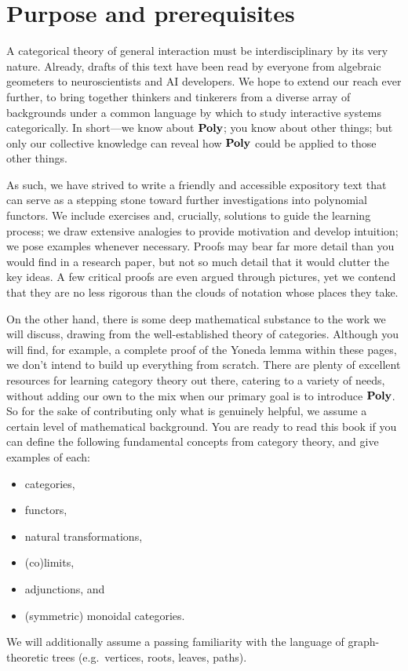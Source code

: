 \documentclass[Book-Poly]{subfiles}
\begin{document}

\section{Purpose and prerequisites}

A categorical theory of general interaction must be interdisciplinary by its very nature.
Already, drafts of this text have been read by everyone from algebraic geometers to neuroscientists and AI developers.
We hope to extend our reach ever further, to bring together thinkers and tinkerers from a diverse array of backgrounds under a common language by which to study interactive systems categorically.
In short---we know about $\mathbf{Poly}$; you know about other things; but only our collective knowledge can reveal how $\mathbf{Poly}$ could be applied to those other things.


As such, we have strived to write a friendly and accessible expository text that can serve as a stepping stone toward further investigations into polynomial functors.
We include exercises and, crucially, solutions to guide the learning process; we draw extensive analogies to provide motivation and develop intuition; we pose examples whenever necessary.
Proofs may bear far more detail than you would find in a research paper, but not so much detail that it would clutter the key ideas.
A few critical proofs are even argued through pictures, yet we contend that they are no less rigorous than the clouds of notation whose places they take.

On the other hand, there is some deep mathematical substance to the work we will discuss, drawing from the well-established theory of categories.
Although you will find, for example, a complete proof of the Yoneda lemma within these pages, we don't intend to build up everything from scratch.
There are plenty of excellent resources for learning category theory out there, catering to a variety of needs, without adding our own to the mix when our primary goal is to introduce $\mathbf{Poly}$.
So for the sake of contributing only what is genuinely helpful, we assume a certain level of mathematical background.
You are ready to read this book if you can define the following fundamental concepts from category theory, and give examples of each:
\begin{itemize}
    \item categories,
    \item functors,
    \item natural transformations,
    \item (co)limits,
    \item adjunctions, and
    \item (symmetric) monoidal categories.
\end{itemize}
We will additionally assume a passing familiarity with the language of graph-theoretic trees (e.g.\ vertices, roots, leaves, paths).
\end{document}
